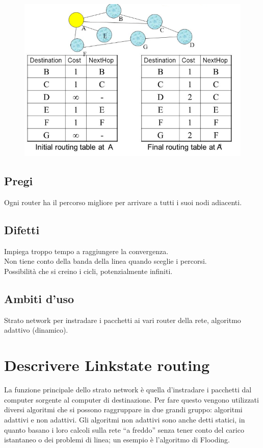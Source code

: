 \begin{figure}[H]
\centering
\includegraphics[scale=0.8]{res/img/33_DistanceVectorRouting.png}
\end{figure} 


\subsection{Pregi}
Ogni router ha il percorso migliore per arrivare a tutti i suoi nodi adiacenti.

\subsection{Difetti}
Impiega troppo tempo a raggiungere la convergenza.\\
Non tiene conto della banda della linea quando sceglie i percorsi.\\
Possibilità che si creino i cicli, potenzialmente infiniti.

\subsection{Ambiti d'uso}
Strato network per instradare i pacchetti ai vari router della rete, algoritmo adattivo (dinamico).

\section{Descrivere Linkstate routing}

La funzione principale dello strato network è quella d'instradare i pacchetti dal computer sorgente al computer di destinazione. Per fare questo vengono utilizzati diversi algoritmi che si possono raggruppare in due grandi gruppo: algoritmi adattivi e non adattivi. Gli algoritmi non adattivi sono anche detti statici, in quanto basano i loro calcoli sulla rete “a freddo” senza tener conto del carico istantaneo o dei problemi di linea; un esempio è l'algoritmo di Flooding.

